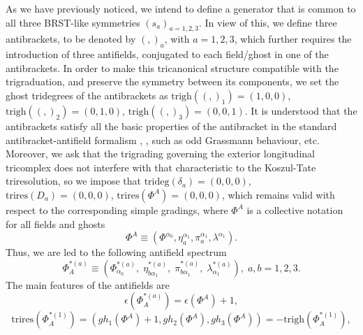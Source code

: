 \documentclass[a4paper,12pt]{article}
\begin{document}
As we have previously noticed, we intend to define a generator that is
common to all three BRST-like symmetries $\left( s_{a}\right) _{a=1,2,3}$.
In view of this, we define three antibrackets, to be denoted by $\left(
,\right) _{a}$, with $a=1,2,3$, which further requires the introduction of
three antifields, conjugated to each field/ghost in one of the antibrackets.
In order to make this tricanonical structure compatible with the
trigraduation, and preserve the symmetry between its components, we set the
ghost tridegrees of the antibrackets as $\mathrm{trigh}\left( \left(
,\right) _{1}\right) =\left( 1,0,0\right) $, $\mathrm{trigh}\left( \left(
,\right) _{2}\right) =\left( 0,1,0\right) $, $\mathrm{trigh}\left( \left(
,\right) _{3}\right) =\left( 0,0,1\right) $. It is understood that the
antibrackets satisfy all the basic properties of the antibracket in the
standard antibracket-antifield formalism \cite{8}, \cite{12}, such as odd
Grassmann behaviour, etc. Moreover, we ask that the trigrading governing the
exterior longitudinal tricomplex does not interfere with that characteristic
to the Koszul-Tate triresolution, so we impose that $\mathrm{trideg}\left(
\delta _{a}\right) =\left( 0,0,0\right) $, $\mathrm{trires}\left(
D_{a}\right) =\left( 0,0,0\right) $, $\mathrm{trires}\left( \Phi ^{A}\right)
=\left( 0,0,0\right) $, which remains valid with respect to the
corresponding simple gradings, where $\Phi ^{A}$ is a collective notation
for all fields and ghosts 
\begin{equation}
\Phi ^{A}\equiv \left( \Phi ^{\alpha _{0}},\eta _{a}^{\alpha _{1}},\pi
_{a}^{\alpha _{1}},\lambda ^{\alpha _{1}}\right) .  \label{sp3.21a}
\end{equation}
Thus, we are led to the following antifield spectrum 
\begin{equation}
\Phi _{A}^{*(a)}\equiv \left( \Phi _{\alpha _{0}}^{*(a)},\;\eta _{b\alpha
_{1}}^{*(a)},\;\pi _{b\alpha _{1}}^{*(a)},\;\lambda _{\alpha
_{1}}^{*(a)}\right) ,\;a,b=1,2,3.  \label{sp3.22}
\end{equation}
The main features of the antifields are 
\begin{equation}
\epsilon \left( \Phi _{A}^{*(a)}\right) =\epsilon \left( \Phi ^{A}\right) +1,
\label{sp3.23}
\end{equation}
\begin{equation}
\mathrm{trires}\left( \Phi _{A}^{*(1)}\right) =\left( gh_{1}\left( \Phi
^{A}\right) +1,gh_{2}\left( \Phi ^{A}\right) ,gh_{3}\left( \Phi ^{A}\right)
\right) =-\mathrm{trigh}\left( \Phi _{A}^{*(1)}\right) ,  \label{sp3.24a}
\end{equation}
\end{document}
